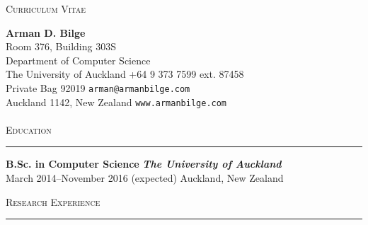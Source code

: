 \documentclass[11pt,letterpaper]{article}
\begin{document}
\thispagestyle{empty}

\null

\centering
\Large \textsc{Curriculum Vitae}

\vspace{0.5\baselineskip}

\begin{flushleft}

\LARGE \textbf{Arman D. Bilge} \hfill \normalsize \\
Room 376, Building 303S \\
Department of Computer Science \\
The University of Auckland \hfill +64 9 373 7599 ext. 87458 \\
Private Bag 92019 \hfill \texttt{arman@armanbilge.com} \\
Auckland 1142, New Zealand \hfill \texttt{www.armanbilge.com} \\

\hfill \\

%

\LARGE \textsc{Education} \\ \vspace{11pt} \hrule \normalsize \vspace{0.5\baselineskip}

\begin{adjustwidth}{1em}{1em}
\textbf{B.Sc. in Computer Science} \hfill \textbf{\emph{The University of Auckland}} \\
March 2014--November 2016 (expected) \hfill Auckland, New Zealand
\end{adjustwidth}

\LARGE \textsc{Research Experience} \\ \vspace{11pt} \hrule \normalsize \vspace{0.5\baselineskip}


\end{flushleft}
\end{document}
